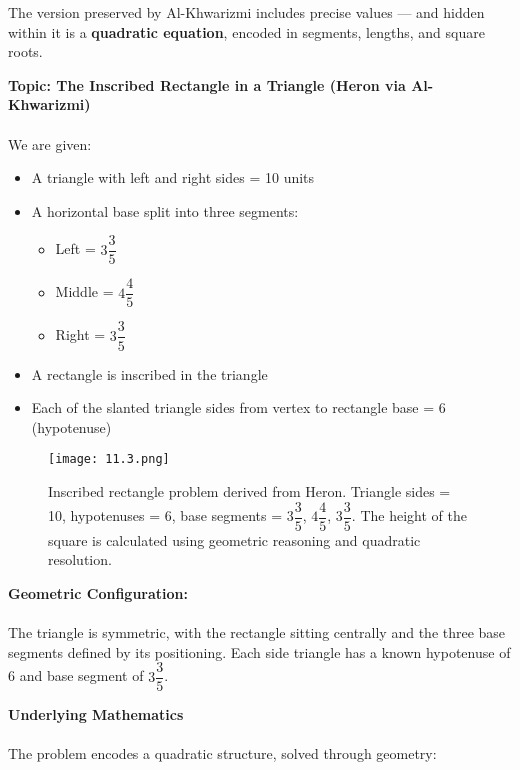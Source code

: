\documentclass[9pt]{article}
\begin{document}
The version preserved by Al-Khwarizmi includes precise values — and hidden within it is a \textbf{quadratic equation}, encoded in segments, lengths, and square roots.

\vspace{1em}

\textbf{Topic: The Inscribed Rectangle in a Triangle (Heron via Al-Khwarizmi)} \\\\
We are given:

\begin{itemize}
    \item A triangle with left and right sides = 10 units
    \item A horizontal base split into three segments:
    \begin{itemize}
        \item Left = $3 \dfrac{3}{5}$
        \item Middle = $4 \dfrac{4}{5}$
        \item Right = $3 \dfrac{3}{5}$
    \end{itemize}
    \item A rectangle is inscribed in the triangle
    \item Each of the slanted triangle sides from vertex to rectangle base = 6 (hypotenuse)
\end{itemize}

\vspace{1em}

\begin{figure}[H]
  \centering
  \texttt{[image: 11.3.png]}
  \caption{Inscribed rectangle problem derived from Heron. Triangle sides = 10, hypotenuses = 6, base segments = $3 \dfrac{3}{5}$, $4 \dfrac{4}{5}$, $3 \dfrac{3}{5}$. The height of the square is calculated using geometric reasoning and quadratic resolution.}
\end{figure}

\vspace{1em}

\textbf{Geometric Configuration:} \\\\
The triangle is symmetric, with the rectangle sitting centrally and the three base segments defined by its positioning. Each side triangle has a known hypotenuse of 6 and base segment of $3 \dfrac{3}{5}$.

\vspace{1em}

\textbf{Underlying Mathematics} \\\\
The problem encodes a quadratic structure, solved through geometry:
\end{document}
